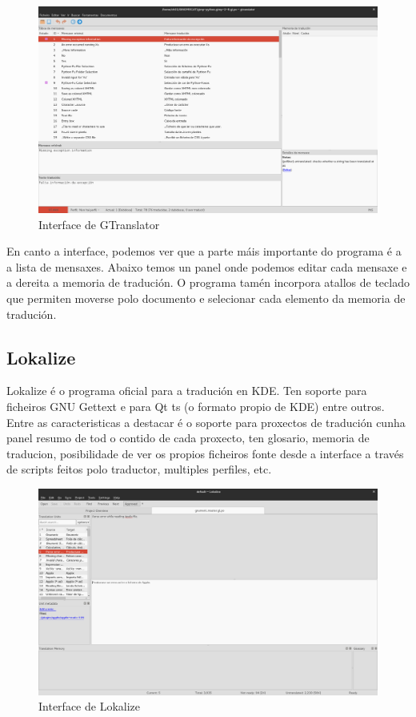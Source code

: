 \begin{figure}[h]
    \centering
    \includegraphics[width=\textwidth]{img/captura_gtranslator.png}
    \caption[Interface de GTranslator]{Interface de GTranslator}
    \label{fig:gtranslator}
\end{figure}

En canto a interface, podemos ver que a parte máis importante do programa é a a lista de mensaxes. Abaixo temos un panel onde podemos editar cada mensaxe e a dereita a memoria de tradución. O programa tamén incorpora atallos de teclado que permiten moverse polo documento e selecionar cada elemento da memoria de tradución.

\subsection{Lokalize}
Lokalize é o programa oficial para a tradución en KDE. Ten soporte para ficheiros GNU Gettext e para Qt ts (o formato propio de KDE) entre outros. Entre as caracteristicas a destacar é o soporte para proxectos de tradución cunha panel resumo de tod o contido de cada proxecto, ten glosario, memoria de traducion, posibilidade de ver os propios ficheiros fonte desde a interface a través de scripts feitos polo traductor, multiples perfiles, etc.

\begin{figure}[h]
    \centering
    \includegraphics[width=\textwidth]{img/captura_lokalize.png}
    \caption[Interface de Lokalize]{Interface de Lokalize}
    \label{fig:gtranslator}
\end{figure}


